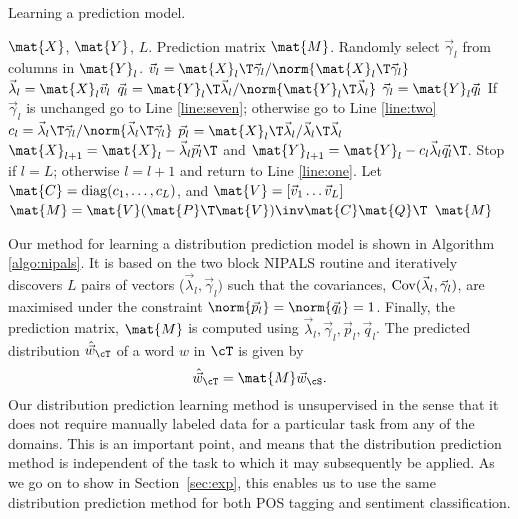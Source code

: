 \documentclass[11pt]{article}
\begin{document}
\begin{algorithm}[t]       
\small
\caption{Learning a prediction model.}        
\label{algo:nipals}                         
\begin{algorithmic}[1]         
\REQUIRE $\mat{X}$, $\mat{Y}$, $L$.
\ENSURE Prediction matrix $\mat{M}$.
\medskip
\STATE Randomly select $\vec{\gamma}_{l}$ from columns in $\mat{Y}_{l}$. \label{line:one}
\STATE $\vec{v}_{l} = \mat{X}_{l}\T\vec{\gamma}_{l} /  \norm{\mat{X}_{l}\T\vec{\gamma}_{l}}$ \label{line:two} 
\STATE $\vec{\lambda}_{l} = \mat{X}_{l}\vec{v}_{l}$
\STATE $\vec{q}_{l} = \mat{Y}_{l}\T\vec{\lambda}_{l} / \norm{\mat{Y}_{l}\T\vec{\lambda}_{l}}$
\STATE $\vec{\gamma}_{l} = \mat{Y}_{l}\vec{q}_{l}$
\STATE If $\vec{\gamma}_{l}$ is unchanged go to Line \ref{line:seven}; otherwise go to Line \ref{line:two}
\STATE $c_{l} = \vec{\lambda}_{l}\T\vec{\gamma}_{l} / \norm{\vec{\lambda}_{l}\T\vec{\gamma}_{l}}$ \label{line:seven}
\STATE $\vec{p}_{l} = \mat{X}_{l}\T\vec{\lambda}_{l} / \vec{\lambda}_{l}\T\vec{\lambda}_{l}$
\STATE $\mat{X}_{l+1} = \mat{X}_{l} - \vec{\lambda}_{l}\vec{p}_{l}\T$ and $\mat{Y}_{l+1} = \mat{Y}_{l} - c_{l}\vec{\lambda}_{l}\vec{q}_{l}\T$.
\STATE Stop if $l = L$; otherwise $l = l + 1$ and return to Line \ref{line:one}.
\medskip
\STATE Let $\mat{C} = {\rm diag}(c_{1}, \ldots, c_{L})$, and $\mat{V} = [\vec{v}_{1} \ldots \vec{v}_{L}]$
\STATE $\mat{M} = \mat{V}(\mat{P}\T\mat{V})\inv\mat{C}\mat{Q}\T$ 
\RETURN $\mat{M}$ 
\end{algorithmic}
\end{algorithm}
Our  method for learning a distribution prediction model is shown in Algorithm \ref{algo:nipals}.
It is based on the two block NIPALS routine \cite{Wold:75,Rosipal:2006} and
iteratively discovers $L$ pairs of vectors ($\vec{\lambda}_{l}, \vec{\gamma}_{l})$ such that the covariances,
 ${\rm Cov}(\vec{\lambda}_{l}, \vec{\gamma}_{l})$,
are maximised under the constraint $\displaystyle \norm{\vec{p}_{l}} = \norm{\vec{q}_{l}} = 1$.
Finally, the prediction matrix, $\mat{M}$ is computed using $\vec{\lambda}_{l}, \vec{\gamma}_{l}, \vec{p}_{l}, \vec{q}_{l}$.
The predicted distribution $\hat{\vec{w}}_{\cT}$ of a word $w$ in $\cT$ is given by
\begin{equation}
\label{eq:pred}
\hat{\vec{w}}_{\cT} = \mat{M} \vec{w}_{\cS}.
\end{equation}
Our distribution prediction learning method is unsupervised in the sense that
it does not require  manually labeled data for a particular task from any of the domains.
This is an important point, and means that the distribution prediction method is
independent of the task to which it may subsequently be applied.
As we go on to show in Section~\ref{sec:exp}, this enables us to use the same
distribution prediction method for both POS tagging and sentiment classification. 
\end{document}

